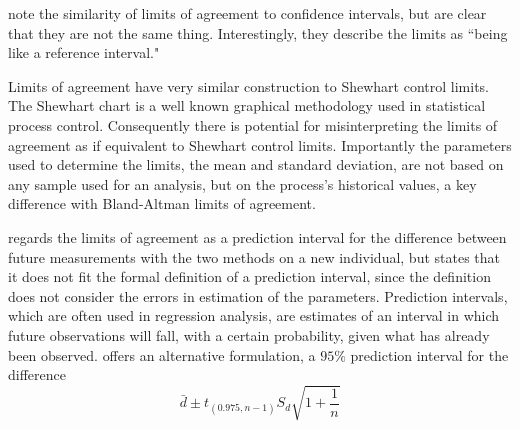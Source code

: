 \documentclass[12pt, a4paper]{report}
\begin{document}
	\citet{BA99} note the similarity of limits of agreement to
	confidence intervals, but are clear that they are not the same
	thing. Interestingly, they describe the limits as ``being like a
	reference interval."
	
	Limits of agreement have very similar construction to Shewhart
	control limits. The Shewhart chart is a well known graphical
	methodology used in statistical process control. Consequently
	there is potential for misinterpreting the limits of agreement as
	if equivalent to Shewhart control limits. Importantly the
	parameters used to determine the limits, the mean and standard
	deviation, are not based on any sample used for an analysis, but
	on the process's historical values, a key difference with
	Bland-Altman limits of agreement.
	
	\citet{BXC2008} regards the limits of agreement as a prediction
	interval for the difference between future measurements with the
	two methods on a new individual, but states that it does not fit
	the formal definition of a prediction interval, since the
	definition does not consider the errors in estimation of the
	parameters. Prediction intervals, which are often used in
	regression analysis, are estimates of an interval in which future
	observations will fall, with a certain probability, given what has
	already been observed. \citet{BXC2008} offers an alternative
	formulation, a $95\%$ prediction interval for the difference
	\begin{equation}
	\bar{d} \pm t_{(0.975, n-1)}S_{d} \sqrt{1+\frac{1}{n}}
	\end{equation}
	
\end{document}
